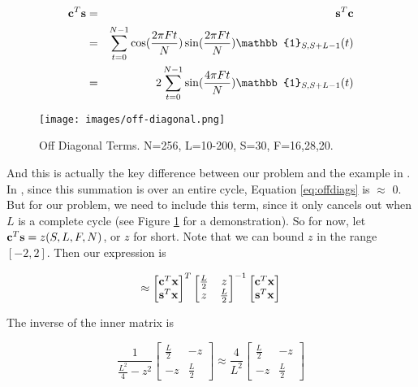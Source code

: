 \documentclass[11pt]{article}
\theoremstyle{plain}
\theoremstyle{definition}
\begin{document}
\begin{eqnarray}
\label{eq:offdiags}
	{\bf c}^T {\bf s} &=& {\bf s}^T {\bf c} \nonumber \\
	&=& \sum_{t=0}^{N-1} \cos(\frac{2 \pi F t}{N}) \sin(\frac{2 \pi F t}{N}) \mathbb{1}_{S,S+L-1}(t) \nonumber \\
	&=& 2 \sum_{t=0}^{N-1} \sin(\frac{4 \pi F t}{N}) \mathbb{1}_{S,S+L-1}(t) \nonumber \\
\end{eqnarray}

\begin{figure}[!ht]
  \centering
  \texttt{[image: images/off-diagonal.png]}
  \caption{Off Diagonal Terms. N=256, L=10-200, S=30, F=16,28,20. }
\label{fig:offdiagonal}
\end{figure}

\noindent And this is actually the key difference between our problem and the example in \cite{kay1993fundamentals}. In \cite{kay1993fundamentals}, since this summation is over an entire cycle, Equation \ref{eq:offdiags} is $\approx$ 0. But for our problem, we need to include this term, since it only cancels out when $L$ is a complete cycle (see Figure \ref{fig:offdiagonal} for a demonstration). So for now, let ${\bf c}^T {\bf s} = z(S, L, F, N)$, or $z$ for short. Note that we can bound $z$ in the range $[-2, 2]$. Then our expression is

$$
\approx 
\begin{bmatrix}
{\bf c}^T {\bf x} \\
{\bf s}^T {\bf x} 
\end{bmatrix}^T
\begin{bmatrix}
\frac{L}{2} & z \\ 
z & \frac{L}{2}	
\end{bmatrix}^{-1}
\begin{bmatrix}
{\bf c}^T {\bf x} \\
{\bf s}^T {\bf x} 
\end{bmatrix}
$$

The inverse of the inner matrix is

$$
\frac{1}{\frac{L^2}{4} - z^2}
\begin{bmatrix}
\frac{L}{2} & -z \\
-z & \frac{L}{2}
\end{bmatrix}
\approx 
\frac{4}{L^2}
\begin{bmatrix}
\frac{L}{2} & -z \\
-z & \frac{L}{2}
\end{bmatrix}
$$
\end{document}
